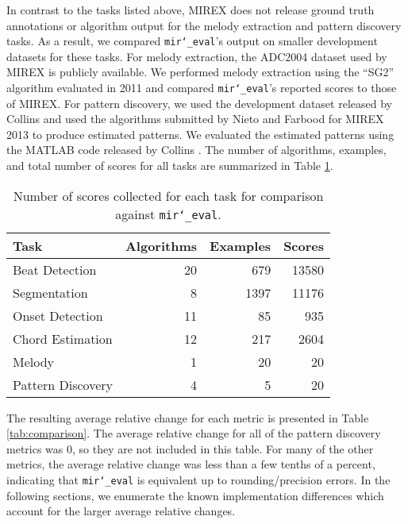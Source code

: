 \documentclass{article}
\def\mireval{\texttt{mir\char`_eval}}
\begin{document}
In contrast to the tasks listed above, MIREX does not release ground truth annotations or algorithm output for the melody extraction and pattern discovery tasks.
As a result, we compared \mireval{}'s output on smaller development datasets for these tasks.
For melody extraction, the ADC2004 dataset used by MIREX is publicly available.
We performed melody extraction using the ``SG2'' algorithm evaluated in 2011 \cite{salamon:MelodyExraction:TASLP:12} and compared \mireval{}'s reported scores to those of MIREX.
For pattern discovery, we used the development dataset released by Collins \cite{Collins2013} and used the algorithms submitted by Nieto and Farbood \cite{nieto2013discovery} for MIREX 2013 to produce estimated patterns.
We evaluated the estimated patterns using the MATLAB code released by Collins \cite{Collins2013}.
The number of algorithms, examples, and total number of scores for all tasks are summarized in Table \ref{tab:nexamples}.

\begin{table}[htb]
  \centering
\begin{tabularx}{\columnwidth}{l r r r}
\toprule
Task & Algorithms & Examples & Scores\\
\midrule
Beat Detection & 20 & 679 & 13580\\
Segmentation & 8 & 1397 & 11176 \\
Onset Detection & 11 & 85 & 935 \\
Chord Estimation & 12 & 217 & 2604 \\
Melody & 1 & 20 & 20 \\
Pattern Discovery & 4 & 5 & 20 \\
\bottomrule
\end{tabularx}
 \caption{Number of scores collected for each task for comparison against \mireval{}.}
 \label{tab:nexamples}
\end{table}

The resulting average relative change for each metric is presented in Table \ref{tab:comparison}.
The average relative change for all of the pattern discovery metrics was 0, so they are not included in this table.
For many of the other metrics, the average relative change was less than a few tenths of a percent, indicating that \mireval{} is equivalent up to rounding/precision errors.
In the following sections, we enumerate the known implementation differences which account for the larger average relative changes.
\end{document}

